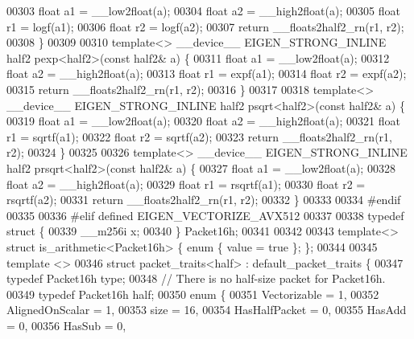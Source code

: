 \begin{DoxyCode}
00303   \textcolor{keywordtype}{float} a1 = \_\_low2float(a);
00304   \textcolor{keywordtype}{float} a2 = \_\_high2float(a);
00305   \textcolor{keywordtype}{float} r1 = logf(a1);
00306   \textcolor{keywordtype}{float} r2 = logf(a2);
00307   \textcolor{keywordflow}{return} \_\_floats2half2\_rn(r1, r2);
00308 \}
00309 
00310 \textcolor{keyword}{template}<> \_\_device\_\_ EIGEN\_STRONG\_INLINE half2 pexp<half2>(\textcolor{keyword}{const} half2& a) \{
00311   \textcolor{keywordtype}{float} a1 = \_\_low2float(a);
00312   \textcolor{keywordtype}{float} a2 = \_\_high2float(a);
00313   \textcolor{keywordtype}{float} r1 = expf(a1);
00314   \textcolor{keywordtype}{float} r2 = expf(a2);
00315   \textcolor{keywordflow}{return} \_\_floats2half2\_rn(r1, r2);
00316 \}
00317 
00318 \textcolor{keyword}{template}<> \_\_device\_\_ EIGEN\_STRONG\_INLINE half2 psqrt<half2>(\textcolor{keyword}{const} half2& a) \{
00319   \textcolor{keywordtype}{float} a1 = \_\_low2float(a);
00320   \textcolor{keywordtype}{float} a2 = \_\_high2float(a);
00321   \textcolor{keywordtype}{float} r1 = sqrtf(a1);
00322   \textcolor{keywordtype}{float} r2 = sqrtf(a2);
00323   \textcolor{keywordflow}{return} \_\_floats2half2\_rn(r1, r2);
00324 \}
00325 
00326 \textcolor{keyword}{template}<> \_\_device\_\_ EIGEN\_STRONG\_INLINE half2 prsqrt<half2>(\textcolor{keyword}{const} half2& a) \{
00327   \textcolor{keywordtype}{float} a1 = \_\_low2float(a);
00328   \textcolor{keywordtype}{float} a2 = \_\_high2float(a);
00329   \textcolor{keywordtype}{float} r1 = rsqrtf(a1);
00330   \textcolor{keywordtype}{float} r2 = rsqrtf(a2);
00331   \textcolor{keywordflow}{return} \_\_floats2half2\_rn(r1, r2);
00332 \}
00333 
00334 \textcolor{preprocessor}{#endif}
00335 
00336 \textcolor{preprocessor}{#elif defined EIGEN\_VECTORIZE\_AVX512}
00337 
00338 \textcolor{keyword}{typedef} \textcolor{keyword}{struct }\{
00339   \_\_m256i x;
00340 \} Packet16h;
00341 
00342 
00343 \textcolor{keyword}{template}<> \textcolor{keyword}{struct }is\_arithmetic<Packet16h> \{ \textcolor{keyword}{enum} \{ value = \textcolor{keyword}{true} \}; \};
00344 
00345 \textcolor{keyword}{template} <>
00346 \textcolor{keyword}{struct }packet\_traits<half> : default\_packet\_traits \{
00347   \textcolor{keyword}{typedef} Packet16h type;
00348   \textcolor{comment}{// There is no half-size packet for Packet16h.}
00349   \textcolor{keyword}{typedef} Packet16h half;
00350   \textcolor{keyword}{enum} \{
00351     Vectorizable = 1,
00352     AlignedOnScalar = 1,
00353     size = 16,
00354     HasHalfPacket = 0,
00355     HasAdd    = 0,
00356     HasSub    = 0,

\end{DoxyCode}
